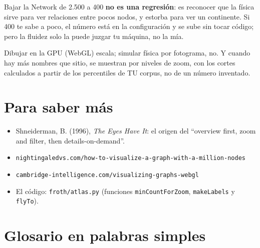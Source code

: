 \documentclass[11pt,a4paper]{article}
\begin{document}
Bajar la Network de 2.500 a 400 \textbf{no es una regresión}: es reconocer que la física
sirve para ver relaciones entre pocos nodos, y estorba para ver un continente. Si 400 te
sabe a poco, el número está en la configuración y se sube sin tocar código; pero la
fluidez solo la puede juzgar tu máquina, no la mía.

\begin{resumen}
Dibujar en la GPU (WebGL) escala; simular física por fotograma, no. Y cuando hay más
nombres que sitio, se muestran por niveles de zoom, con los cortes calculados a partir de
los percentiles de TU corpus, no de un número inventado.
\end{resumen}

\section{Para saber más}

\begin{itemize}
  \item Shneiderman, B. (1996), \emph{The Eyes Have It}: el origen del ``overview first,
        zoom and filter, then details-on-demand''.
  \item \texttt{nightingaledvs.com/how-to-visualize-a-graph-with-a-million-nodes}
  \item \texttt{cambridge-intelligence.com/visualizing-graphs-webgl}
  \item El código: \texttt{froth/atlas.py} (funciones \texttt{minCountForZoom},
        \texttt{makeLabels} y \texttt{flyTo}).
\end{itemize}
\clearpage
{}
{}

\section{Glosario en palabras simples}
\end{document}
